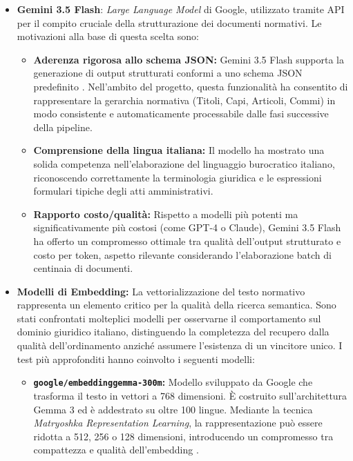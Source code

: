\begin{itemize}
    \item \textbf{Gemini 3.5 Flash}\cite{gemini}: \textit{Large Language Model} di Google, utilizzato tramite API per il compito cruciale della strutturazione dei documenti normativi. Le motivazioni alla base di questa scelta sono:
    \begin{itemize}
        \item \textbf{Aderenza rigorosa allo schema JSON:} Gemini 3.5 Flash supporta la generazione di output strutturati conformi a uno schema JSON predefinito \cite{gemini_structured_output}. Nell'ambito del progetto, questa funzionalità ha consentito di rappresentare la gerarchia normativa (Titoli, Capi, Articoli, Commi) in modo consistente e automaticamente processabile dalle fasi successive della pipeline.
        \item \textbf{Comprensione della lingua italiana:} Il modello ha mostrato una solida competenza nell'elaborazione del linguaggio burocratico italiano, riconoscendo correttamente la terminologia giuridica e le espressioni formulari tipiche degli atti amministrativi.
        \item \textbf{Rapporto costo/qualità:} Rispetto a modelli più potenti ma significativamente più costosi (come GPT-4 o Claude), Gemini 3.5 Flash ha offerto un compromesso ottimale tra qualità dell'output strutturato e costo per token, aspetto rilevante considerando l'elaborazione batch di centinaia di documenti.
    \end{itemize}

    \item \textbf{Modelli di Embedding:} La vettorializzazione del testo normativo rappresenta un elemento critico per la qualità della ricerca semantica. Sono stati confrontati molteplici modelli per osservarne il comportamento sul dominio giuridico italiano, distinguendo la completezza del recupero dalla qualità dell'ordinamento anziché assumere l'esistenza di un vincitore unico. I test più approfonditi hanno coinvolto i seguenti modelli:
    \begin{itemize}
        \item \textbf{\texttt{google/embeddinggemma-300m}:} Modello sviluppato da Google che trasforma il testo in vettori a 768 dimensioni. È costruito sull'architettura Gemma 3 ed è addestrato su oltre 100 lingue. Mediante la tecnica \textit{Matryoshka Representation Learning}, la rappresentazione può essere ridotta a 512, 256 o 128 dimensioni, introducendo un compromesso tra compattezza e qualità dell'embedding \cite{embeddinggemma}.
        

\end{itemize}
\end{itemize}
